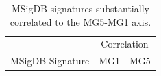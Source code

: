 \documentclass[dissertation.tex]{subfiles}
\begin{document}
\begin{table}[ht]
\caption{\acrshort{MSigDB} signatures substantially correlated to the MG5-MG1 axis.}
\label{tbl:sigs-msigdb-corrs-mg15}
\centering
\begin{tabularx}{\textwidth}{ @{} X l l @{} }
  \toprule
   & \multicolumn{2}{c}{Correlation} \\
  MSigDB Signature & MG1 & MG5 \\ 
  \midrule

\end{tabularx}
\end{table}
\end{document}

